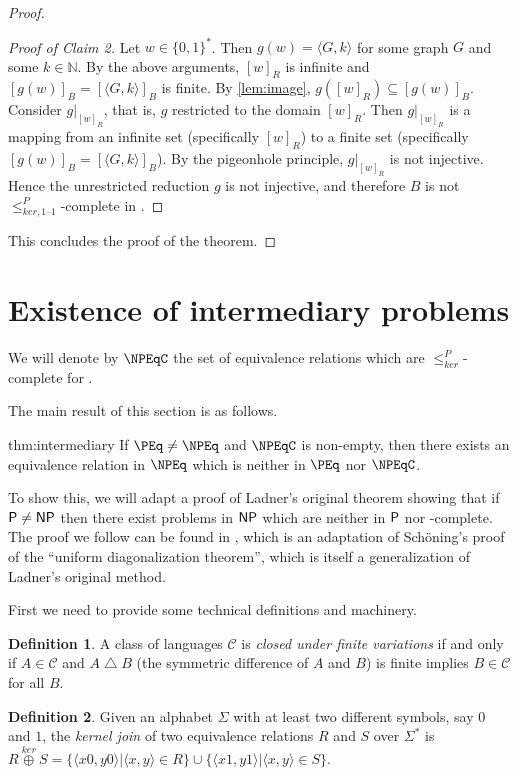 \documentclass[draft]{article}
\theoremstyle{definition} \newtheorem{openproblem}[openproblem]{Open problem}
\theoremstyle{definition} \newtheorem{definition}[definition]{Definition}
\theoremstyle{remark} \newtheorem{remark}{Remark}
\newcommand{\sigmastar}{\{0, 1\}^{*}} %
\newcommand{\kj}{\overset{ker}{\oplus}} %
\newcommand{\kr}{\leq^{P}_{ker}} %
\newcommand{\kri}{\leq^{P}_{ker,1\text{--}1}} %
\newcommand{\symdiff}{\bigtriangleup} %
\newcommand{\defn}[1]{\emph{#1}} %
\newcommand{\pair}[2]{\langle#1,#2\rangle} %
\newcommand{\printintermediarytheorem}{If $\PEq\neq\NPEq$ and $\NPEqC$ is non-empty, then there exists an equivalence relation in $\NPEq$ which is neither in $\PEq$ nor $\NPEqC$.}
\begin{document}
\begin{proof}
\begin{proof}[Proof of Claim 2]
    Let $w\in\sigmastar$.
    Then $g(w)=\pair{G}{k}$ for some graph $G$ and some $k\in\mathbb{N}$.
    By the above arguments, $[w]_R$ is infinite and $[g(w)]_B=[\pair{G}{k}]_B$ is finite.
    By \autoref{lem:image}, $g([w]_R)\subseteq [g(w)]_B$.
    Consider $g|_{[w]_R}$, that is, $g$ restricted to the domain $[w]_R$.
    Then $g|_{[w]_R}$ is a mapping from an infinite set (specifically $[w]_R$) to a finite set (specifically $[g(w)]_B=[\pair{G}{k}]_B$).
    By the pigeonhole principle, $g|_{[w]_R}$ is not injective.
    Hence the unrestricted reduction $g$ is not injective, and therefore $B$ is not $\kri$-complete in \NPEq.
  \end{proof}
  This concludes the proof of the theorem.
\end{proof}

\section{Existence of intermediary problems}

We will denote by $\NPEqC$ the set of equivalence relations which are $\kr$-complete for \NPEq.

The main result of this section is as follows.
\begin{reptheorem}{thm:intermediary}
  \printintermediarytheorem
\end{reptheorem}
To show this, we will adapt a proof of Ladner's original theorem\cite{ladner} showing that if $\P\neq\NP$ then there exist problems in $\NP$ which are neither in $\P$ nor \NP-complete.
The proof we follow can be found in \cite{bdg95}, which is an adaptation of Sch\"{o}ning's proof of the ``uniform diagonalization theorem''\cite{schoning}, which is itself a generalization of Ladner's original method.

First we need to provide some technical definitions and machinery.

\begin{definition}
  A class of languages $\mathcal{C}$ is \defn{closed under finite variations} if and only if $A\in \mathcal{C}$ and $A\symdiff B$ (the symmetric difference of $A$ and $B$) is finite implies $B\in \mathcal{C}$ for all $B$.
\end{definition}

\begin{definition}
  Given an alphabet $\Sigma$ with at least two different symbols, say $0$ and $1$, the \defn{kernel join} of two equivalence relations $R$ and $S$ over $\Sigma^*$ is $R\kj S=\{\pair{x0}{y0}|\pair{x}{y}\in R\}\cup\{\pair{x1}{y1}|\pair{x}{y}\in S\}$.
\end{definition}
\end{document}
